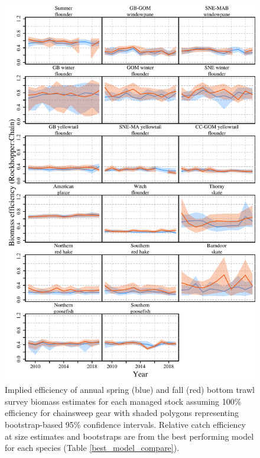 \documentclass[
  12pt,
]{article}
\begin{document}
\begin{figure}
\caption{Implied efficiency of annual spring (blue) and fall (red) bottom trawl survey biomass estimates for each managed stock assuming 100\% efficiency for chainsweep gear with shaded polygons representing bootstrap-based 95\% confidence intervals. Relative catch efficiency at size estimates and bootstraps are from the best performing model for each species (Table \ref{best_model_compare}).}\label{stock_biomass_efficiency_plot}
\begin{center}
\includegraphics[height = 0.8\textheight]{stock_biomass_efficiency_plot.pdf}
\end{center}
\end{figure}

\clearpage
\end{document}
